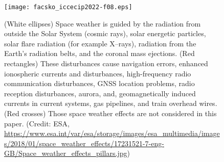 \documentclass[sn-aps]{sn-jnl}%
\begin{document}

\begin{figure}[h]
\centering
\texttt{[image: facsko\_iccecip2022-f08.eps]}
\caption{(White ellipses) Space weather is guided by the radiation from outside the Solar System (cosmic rays), solar energetic particles, solar flare radiation (for example X--rays), radiation from the Earth's radiation belts, and the coronal mass ejections. (Red rectangles) These disturbances cause navigation errors, enhanced ionospheric currents and disturbances, high-frequency radio communication disturbances, GNSS location problems, radio reception disturbances, aurora, and, geomagnetically induced currents in current systems, gas pipelines, and train overhead wires. (Red crosses) Those space weather effects are not considered in this paper. (Credit: ESA, \url{https://www.esa.int/var/esa/storage/images/esa_multimedia/images/2018/01/space_weather_effects/17231521-7-eng-GB/Space_weather_effects_pillars.jpg})} \label{fig:sweffects}
\end{figure}
\end{document}
